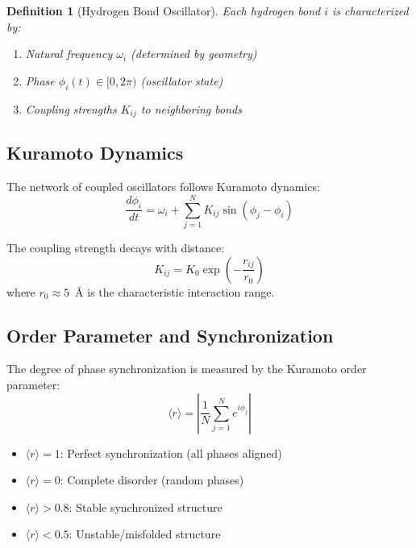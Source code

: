 \documentclass[twocolumn,aps,prx,superscriptaddress,longbibliography]{revtex4-2}
\newtheorem{definition}[theorem]{Definition}
\theoremstyle{remark}
\newcommand{\orderpar}{\langle r \rangle}
\begin{document}
\begin{definition}[Hydrogen Bond Oscillator]
\label{def:oscillator}
Each hydrogen bond $i$ is characterized by:
\begin{enumerate}
    \item Natural frequency $\omega_i$ (determined by geometry)
    \item Phase $\phi_i(t) \in [0, 2\pi)$ (oscillator state)
    \item Coupling strengths $K_{ij}$ to neighboring bonds
\end{enumerate}
\end{definition}

\subsection{Kuramoto Dynamics}

The network of coupled oscillators follows Kuramoto dynamics:
\begin{equation}
\frac{d\phi_i}{dt} = \omega_i + \sum_{j=1}^{N} K_{ij} \sin(\phi_j - \phi_i)
\label{eq:kuramoto}
\end{equation}

The coupling strength decays with distance:
\begin{equation}
K_{ij} = K_0 \exp\left(-\frac{r_{ij}}{r_0}\right)
\label{eq:coupling}
\end{equation}
where $r_0 \approx 5$~\AA{} is the characteristic interaction range.

\subsection{Order Parameter and Synchronization}

The degree of phase synchronization is measured by the Kuramoto order
parameter:
\begin{equation}
\orderpar = \left| \frac{1}{N} \sum_{j=1}^{N} e^{i\phi_j} \right|
\label{eq:order}
\end{equation}

\begin{itemize}
    \item $\orderpar = 1$: Perfect synchronization (all phases aligned)
    \item $\orderpar = 0$: Complete disorder (random phases)
    \item $\orderpar > 0.8$: Stable synchronized structure
    \item $\orderpar < 0.5$: Unstable/misfolded structure
\end{itemize}
\end{document}
